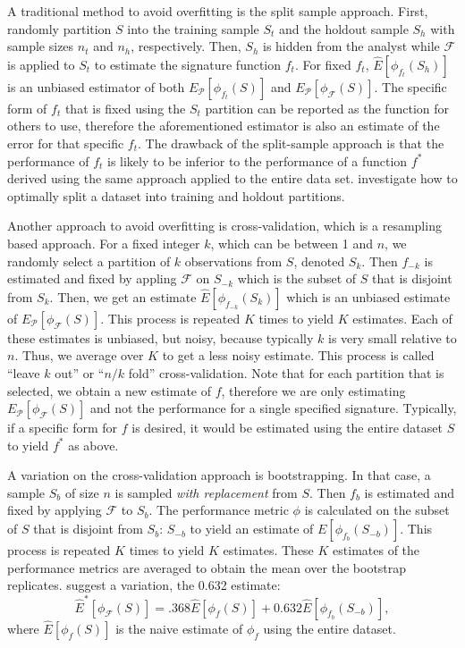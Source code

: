 \documentclass[12pt,]{article}
\begin{document}
A traditional method to avoid overfitting is the split sample approach.
First, randomly partition \(S\) into the training sample \(S_t\) and the
holdout sample \(S_h\) with sample sizes \(n_t\) and \(n_h\),
respectively. Then, \(S_h\) is hidden from the analyst while
\(\mathcal{F}\) is applied to \(S_t\) to estimate the signature function
\(f_t\). For fixed \(f_t\), \(\hat{E}[\phi_{f_t}(S_h)]\) is an unbiased
estimator of both \(E_{\mathcal{P}}[\phi_{f_t}(S)]\) and
\(E_\mathcal{P}[\phi_\mathcal{F}(S)]\). The specific form of \(f_t\)
that is fixed using the \(S_t\) partition can be reported as the
function for others to use, therefore the aforementioned estimator is
also an estimate of the error for that specific \(f_t\). The drawback of
the split-sample approach is that the performance of \(f_t\) is likely
to be inferior to the performance of a function \(f^*\) derived using
the same approach applied to the entire data set.
\citet{dobbin2011optimally} investigate how to optimally split a dataset
into training and holdout partitions.

Another approach to avoid overfitting is cross-validation, which is a
resampling based approach. For a fixed integer \(k\), which can be
between 1 and \(n\), we randomly select a partition of \(k\)
observations from \(S\), denoted \(S_k\). Then \(f_{-k}\) is estimated
and fixed by appling \(\mathcal{F}\) on \(S_{-k}\) which is the subset
of \(S\) that is disjoint from \(S_k\). Then, we get an estimate
\(\hat{E}[\phi_{f_{-k}}(S_k)]\) which is an unbiased estimate of
\(E_{\mathcal{P}}[\phi_{\mathcal{F}}(S)]\). This process is repeated
\(K\) times to yield \(K\) estimates. Each of these estimates is
unbiased, but noisy, because typically \(k\) is very small relative to
\(n\). Thus, we average over \(K\) to get a less noisy estimate. This
process is called ``leave \(k\) out'' or ``\(n/k\) fold''
cross-validation. Note that for each partition that is selected, we
obtain a new estimate of \(f\), therefore we are only estimating
\(E_{\mathcal{P}}[\phi_{\mathcal{F}}(S)]\) and not the performance for a
single specified signature. Typically, if a specific form for \(f\) is
desired, it would be estimated using the entire dataset \(S\) to yield
\(f^*\) as above.

A variation on the cross-validation approach is bootstrapping. In that
case, a sample \(S_b\) of size \(n\) is sampled \emph{with replacement}
from \(S\). Then \(f_{b}\) is estimated and fixed by applying
\(\mathcal{F}\) to \(S_{b}\). The performance metric \(\phi\) is
calculated on the subset of \(S\) that is disjoint from \(S_b\):
\(S_{-b}\) to yield an estimate of \(E[\phi_{f_b}(S_{-b})]\). This
process is repeated \(K\) times to yield \(K\) estimates. These \(K\)
estimates of the performance metrics are averaged to obtain the mean
over the bootstrap replicates. \citet{efron1997improvements} suggest a
variation, the 0.632 estimate: \[
\hat{E}^*[\phi_{\mathcal{F}}(S)] = .368 \hat{E}[\phi_{f}(S)] + 0.632 \hat{E}[\phi_{f_b}(S_{-b})],
\] where \(\hat{E}[\phi_{f}(S)]\) is the naive estimate of \(\phi_f\)
using the entire dataset.
\end{document}
